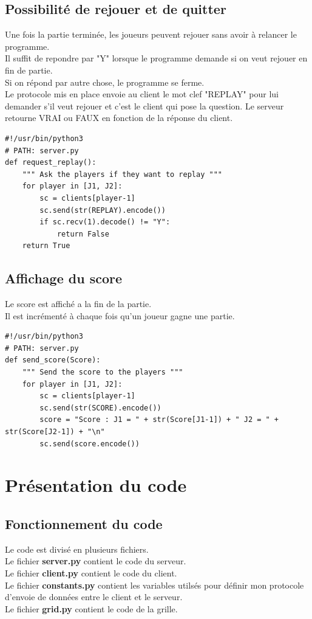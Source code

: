 \documentclass{article}
\begin{document}
\subsection{Possibilité de rejouer et de quitter}
Une fois la partie terminée, les joueurs peuvent rejouer sans avoir à relancer le programme.\\
Il suffit de repondre par "Y" lorsque le programme demande si on veut rejouer en fin de partie.\\
Si on répond par autre chose, le programme se ferme.\\
Le protocole mis en place envoie au client le mot clef "REPLAY" pour lui demander s'il veut rejouer et c'est le client qui pose la question.
Le serveur retourne VRAI ou FAUX en fonction de la réponse du client.\\
\begin{lstlisting}
#!/usr/bin/python3
# PATH: server.py
def request_replay():
    """ Ask the players if they want to replay """
    for player in [J1, J2]:
        sc = clients[player-1]
        sc.send(str(REPLAY).encode())
        if sc.recv(1).decode() != "Y":
            return False
    return True
\end{lstlisting}

\subsection{Affichage du score}
Le score est affiché a la fin de la partie.\\
Il est incrémenté à chaque fois qu'un joueur gagne une partie.\\
\begin{lstlisting}
#!/usr/bin/python3
# PATH: server.py
def send_score(Score):
    """ Send the score to the players """
    for player in [J1, J2]:
        sc = clients[player-1]
        sc.send(str(SCORE).encode())
        score = "Score : J1 = " + str(Score[J1-1]) + " J2 = " + str(Score[J2-1]) + "\n"
        sc.send(score.encode())

\end{lstlisting}

\newpage

\section{Présentation du code}
\subsection{Fonctionnement du code}
Le code est divisé en plusieurs fichiers.\\
Le fichier \textbf{server.py} contient le code du serveur.\\
Le fichier \textbf{client.py} contient le code du client.\\
Le fichier \textbf{constants.py} contient les variables utilsés pour définir mon protocole d'envoie de données entre le client et le serveur.\\
Le fichier \textbf{grid.py} contient le code de la grille.\\
\end{document}
